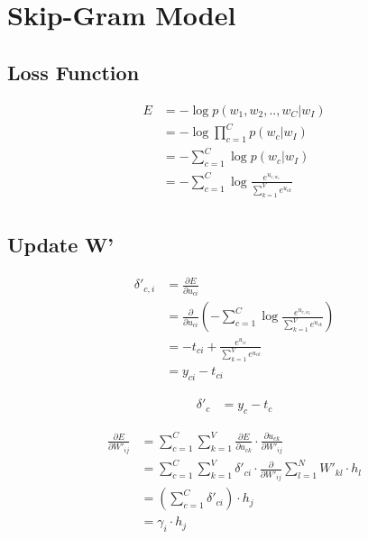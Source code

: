 \documentclass{article}
\begin{document}
	\section{Skip-Gram Model}
	\subsection{Loss Function}
	\begin{equation}
		\begin{aligned}
			E &=-\log p(w_{1}, w_{2}, .., w_{C}|w_{I})\\ 
			&= -\log \prod_{c=1}^{C} p(w_{c}|w_{I}) \\
			&= -\sum_{c=1}^{C} \log p(w_{c}|w_{I}) \\ 
			&= -\sum_{c=1}^{C} \log \frac{e^{u_{c,w_c}}}{\sum_{k=1}^{V}e^{u_{ck}}} \\ 
		\end{aligned}
	\end{equation}
	
	\subsection{Update W'}
	\begin{equation}
		\begin{aligned}
			\delta'_{c, i} &= \frac{\partial E}{\partial u_{ci}} \\
			&= \frac{\partial}{\partial u_{ci}} \left(
			-\sum_{c=1}^{C} \log \frac{e^{u_{c,w_c}}}{\sum_{k=1}^{V}e^{u_{ck}}} \right) \\
			&= -t_{ci} + \frac{e^{u_{ci}}}{\sum_{k=1}^{V}e^{u_{ck}}} \\
			&= y_{ci} - t_{ci}
		\end{aligned}
	\end{equation}
	
	\begin{equation}
		\begin{aligned}
			\delta'_{c} &= y_{c} - t_{c} 
		\end{aligned}
	\end{equation}

	\begin{equation}
		\begin{aligned}
			\frac{\partial E}{\partial W'_{ij}} &= \sum_{c=1}^{C} \sum_{k=1}^{V} \frac{\partial E}{\partial u_{ck}} \cdot \frac{\partial u_{ck}}{\partial W'_{ij}} \\
			&= \sum_{c=1}^{C} \sum_{k=1}^{V} \delta'_{ci} \cdot \frac{\partial}{\partial W'_{ij}}\sum_{l=1}^{N} W'_{kl} \cdot h_l \\
			&= \left(\sum_{c=1}^{C} \delta'_{ci} \right)\cdot h_j \\
			&= \gamma_i \cdot h_j
		\end{aligned}	
	\end{equation}
	
\end{document}
